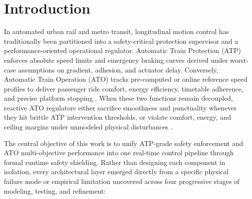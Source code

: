 \documentclass[10pt,a4paper]{article}
\begin{document}
\begin{abstract}
10 live Finnish Digitraffic + Open-Meteo scenarios ($2.02\,\text{s}$ vs. $3.42\,\text{s}$ deadline error, $3.6269$ vs. $5.0556$ $\text{LossScore}$) in $11.8\text{--}27.1\,\mu\text{s}$ mean step latency.
\end{abstract}

\section{Introduction}

In automated urban rail and metro transit, longitudinal motion control has traditionally been partitioned into a safety-critical protection supervisor and a performance-oriented operational regulator. Automatic Train Protection (ATP) enforces absolute speed limits and emergency braking curves derived under worst-case assumptions on gradient, adhesion, and actuator delay. Conversely, Automatic Train Operation (ATO) tracks pre-computed or online reference speed profiles to deliver passenger ride comfort, energy efficiency, timetable adherence, and precise platform stopping \cite{ref1, ref2, ref17}. When these two functions remain decoupled, reactive ATO regulators either sacrifice smoothness and punctuality whenever they hit brittle ATP intervention thresholds, or violate comfort, energy, and ceiling margins under unmodeled physical disturbances \cite{ref6, ref17}.

The central objective of this work is to unify ATP-grade safety enforcement and ATO multi-objective performance into one real-time control pipeline through formal runtime safety shielding. Rather than designing each component in isolation, every architectural layer emerged directly from a specific physical failure mode or empirical limitation uncovered across four progressive stages of modeling, testing, and refinement:
\end{document}
